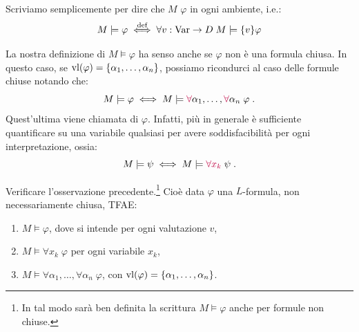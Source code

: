 \begin{notation}
    Scriviamo semplicemente  per dire che $M$  $\varphi$ in ogni ambiente, i.e.:
    \[ M \models \varphi \overset{\text{def}}{\iff} \forall v : \operatorname{Var} \to D \; M \models \{v\} \varphi
    \]
\end{notation}

\begin{remark}
    La nostra definizione di $M \models \varphi$ ha senso anche se $\varphi$ non è una formula chiusa. In questo caso, se $\operatorname{vl}(\varphi) = \{\alpha_1,\ldots,\alpha_n\}$, possiamo ricondurci al caso delle formule chiuse notando che:
    \[ M \models \varphi \iff M \models \textcolor{purple}{\forall}\alpha_1, \ldots, \textcolor{purple}{\forall} \alpha_n \; \varphi \;.
    \]
    Quest'ultima viene chiamata  di $\varphi$. Infatti, più in generale è sufficiente quantificare su una variabile qualsiasi per avere soddisfacibilità per ogni interpretazione, ossia:
    \[ M \models \psi \iff M \models \textcolor{purple}{\forall x_k} \; \psi \;.
    \]
\end{remark}

\begin{exercise}
    Verificare l'osservazione precedente.\footnote{In tal modo sarà ben definita la scrittura $M \models \varphi$ anche per formule non chiuse.} Cioè data $\varphi$ una $L$-formula, non necessariamente chiusa, TFAE:
    \begin{enumerate}
        \item $M \models \varphi$, dove si intende per ogni valutazione $v$,
        \item $M \models \forall x_k \; \varphi$ per ogni variabile $x_k$,
        \item $M \models \forall \alpha_1, \ldots, \forall \alpha_n \; \varphi$, con $\operatorname{vl}(\varphi) = \{\alpha_1,\ldots,\alpha_n\}$.
    \end{enumerate}
\end{exercise}

